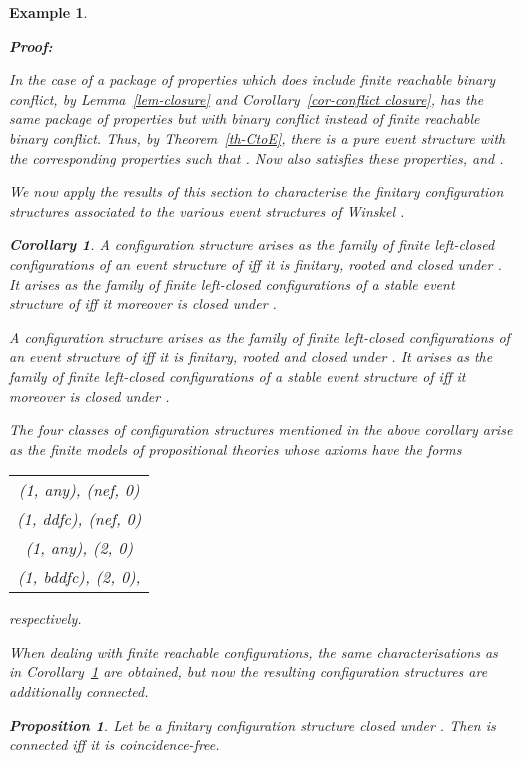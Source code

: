 \documentclass[twocolumn]{article}
\newtheorem{prop}{Proposition}[section]
\newtheorem{coro}{Corollary}
\newtheorem{exam}{Example}
\newenvironment{proposition}[1]{\begin{prop} \rm \label{pr-#1} }{\end{prop}}
\newenvironment{corollary}[1]{\begin{coro} \rm \label{cor-#1} }{\end{coro}}
\newenvironment{example}[1]{\begin{exam} \rm \label{ex-#1} }{\end{exam}}
\newenvironment{proof}{\begin{trivlist} \item[\hspace{\labelsep}\bf
Proof:]}{\hfill \end{trivlist}}
\newcommand{\thm}[1]{Theorem~\ref{th-#1}}
\newcommand{\lem}[1]{Lemma~\ref{lem-#1}}
\newcommand{\cor}[1]{Corollary~\ref{cor-#1}}
\begin{document}
\begin{example}{causality}
\begin{proof}
\begin{enumerate}
In the case of a package of properties which does include finite reachable
binary conflict, by \lem{closure} and \cor{conflict closure}, 
has the same package of properties but with binary conflict instead of
finite reachable binary conflict. Thus, by \thm{CtoE}, there is a pure event
structure  with the corresponding properties such that
.  Now  also satisfies these properties, and
.
\hfill
\end{enumerate}



\noindent
We now apply the results of this section to characterise the finitary
configuration structures associated to the various event structures of
{\sc Winskel} \cite{Wi87a,Wi89}.

\begin{corollary}{characterisation-Winskel finitary}
A configuration structure arises as the family of finite left-closed
configurations of an event structure of \cite{Wi87a} iff it is
finitary, rooted and closed under . It arises as the
family of finite left-closed configurations of a stable event
structure of \cite{Wi87a} iff it moreover is closed under .

A configuration structure arises as the family of finite left-closed
configurations of an event structure of \cite{Wi89} iff it is
finitary, rooted and closed under .  It arises as the
family of finite left-closed configurations of a stable event
structure of \cite{Wi89} iff it moreover is closed under .
\hfill 
\end{corollary}
The four classes of configuration structures mentioned in the above
corollary arise as the finite models of propositional
theories whose axioms have the forms
\begin{center}
\begin{tabular}{c}
(1, any), (nef, 0)\\
(1, ddfc), (nef, 0)\\
(1, any), (2, 0)\\
(1, bddfc), (2, 0),
\end{tabular}
\end{center}
respectively.

When dealing with finite \emph{reachable} configurations, the same
characterisations as in \cor{characterisation-Winskel finitary} are
obtained, but now the resulting configuration structures are
additionally connected.

\begin{proposition}{coincidence-freeness-connectedness}
Let  be a finitary configuration structure closed under
.  Then  is connected iff it is coincidence-free.
\end{proposition}


\end{proof}
\end{example}
\end{document}
